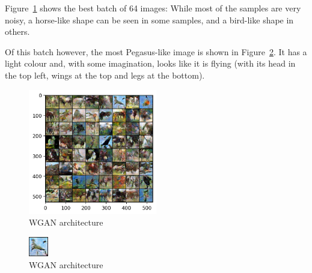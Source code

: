 Figure~\ref{fig:best-batch} shows the best batch of 64 images:
While most of the samples are very noisy, a horse-like shape can be seen in some samples, and a bird-like shape in others.

Of this batch however, the most Pegasus-like image is shown in Figure~\ref{fig:best-image}.
It has a light colour and, with some imagination, looks like it is flying (with its head in the top left, wings at the top and legs at the bottom).

\begin{figure}[h]
    \centering
    \caption{WGAN architecture}
    \label{fig:best-batch}
    \includegraphics[width=0.5\textwidth]{figures/best-batch}
\end{figure}

\begin{figure}[h]
    \centering
    \caption{WGAN architecture}
    \label{fig:best-image}
    \includegraphics[width=0.075\textwidth]{figures/best-pegasus}
\end{figure}
